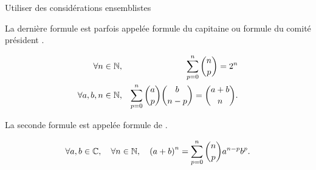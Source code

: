 \documentclass{magnolia}
\begin{document}
\begin{preuve}
Utiliser des considérations ensemblistes
\end{preuve}

\begin{remarqueUnique}
\remarque La dernière formule est parfois appelée \og formule du capitaine \fg ou formule du
  \og comité président \fg.
\end{remarqueUnique}

\begin{proposition}
\begin{eqnarray*}
\forall n\in\mathbb{N}, & & \sum_{p=0}^n \binom{n}{p}=2^n\\
\forall a,b,n\in\mathbb{N}, & & \sum_{p=0}^n \binom{a}{p}\binom{b}{n-p}=\binom{a+b}{n}. 
\end{eqnarray*}
\end{proposition}

\begin{remarqueUnique}
\remarque La seconde formule est appelée formule de .
\end{remarqueUnique}

\begin{proposition}[nom={Binôme de \nom{Newton}}]
\[\forall a,b\in\mathbb{C},\quad \forall n\in\mathbb{N},\quad \left(a+b\right)^n =\sum_{p=0}^n \binom{n}{p} a^{n-p} b^p.\]
\end{proposition}


\end{document}
